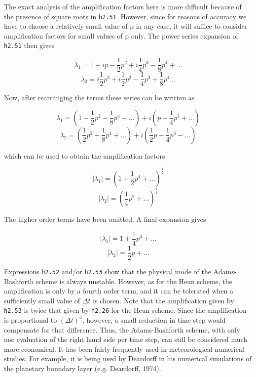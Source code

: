 The exact analysis of the amplification factors here is more difficult
because of the presence of square roots in \texttt{h2.51}. However,
since for reasons of accuracy we have to choose a relatively small value
of p in any case, it will suffice to consider amplification factors for
small values of p only. The power series expansion of \texttt{h2.51}
then gives

\[\lambda_{1} = 1 + ip - \frac{1}{2}p^{2} + i\frac{1}{4}p^{3} - \frac{1}{8}p^{4} + \ldots\]\[\lambda_{2} = i\frac{1}{2}p^{2} + i\frac{1}{2}p^{2} - \frac{1}{4}p^{3} + \frac{1}{8}p^{4}\ldots\]

Now, after rearranging the terms these series can be written as

\[\lambda_{1} = \left( 1 - \frac{1}{2}p^{2} - \frac{1}{8}p^{4} - \ldots \right) + i\left( p + \frac{1}{4}p^{3} + \ldots \right)\]\[\lambda_{2} = \left( \frac{1}{2}p^{2} + \frac{1}{8}p^{4} + \ldots \right) + i\left( \frac{1}{2}p - \frac{1}{4}p^{3} - \ldots \right)\]

which can be used to obtain the amplification factors

\[\left| \lambda_{1} \right| = \left( 1 + \frac{1}{2}p^{4} + \ldots \right)^{\frac{1}{2}}\]\[\left| \lambda_{2} \right| = \left( \frac{1}{4}p^{2} + \ldots \right)^{\frac{1}{2}}\]

The higher order terms have been omitted. A final expansion gives

\[\left| \lambda_{1} \right| = 1 + \frac{1}{4}p^{4} + \ldots\]\[\left| \lambda_{2} \right| = \frac{1}{2}p + \ldots\]

Expressions \texttt{h2.52} and/or \texttt{h2.53} show that the physical
mode of the Adams-Bashforth scheme is always unstable. However, as for
the Heun scheme, the amplification is only by a fourth order term, and
it can be tolerated when a sufficiently small value of \(\Delta t\) is
chosen. Note that the amplification given by \texttt{h2.53} is twice
that given by \texttt{h2.26} for the Heun scheme. Since the
amplification is proportional to \(\left( \Delta t \right)^{4}\),
however, a small reduction in time step would compensate for that
difference. Thus, the Adams-Bashforth scheme, with only one evaluation
of the right hand side per time step, can still be considered much more
economical. It has been fairly frequently used in meteorological
numerical studies. For example, it is being used by Deardorff in his
numerical simulations of the planetary boundary layer (e.g. Deardorff,
1974).

